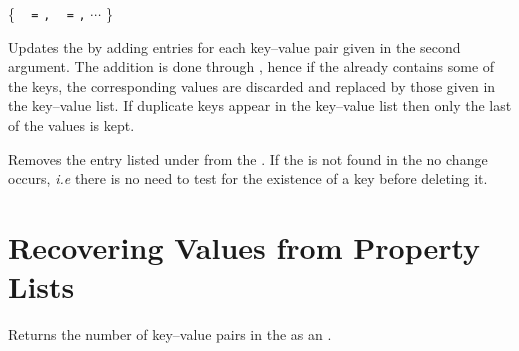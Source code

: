 \documentclass[oneside]{book}
\begin{document}
\begin{function}{\propPutFromKeyval}
\begin{syntax}
 
\{
~  \verb|=|  \verb|,|
~  \verb|=|  \verb|,| $\cdots$
\}
\end{syntax}
Updates the  by adding entries for each key--value
pair given in the second argument.  The addition is done through
, hence if the  already contains
some of the keys, the corresponding values are discarded and
replaced by those given in the key--value list.  If duplicate keys
appear in the key--value list then only the last of the values is kept.
\begin{codehigh}
\propSetFromKeyval {}
\propPutFromKeyval {}
\propVarLog \lTmpaProp
\end{codehigh}
\end{function}

\begin{function}{\propVarRemove}
\begin{syntax}
  
\end{syntax}
Removes the entry listed under  from the
.  If the  is
not found in the  no change occurs,
\emph{i.e} there is no need to test for the existence of a key before
deleting it.
\begin{codehigh}
\propSetFromKeyval {}
\propVarRemove {}
\propVarLog \lTmpaProp
\end{codehigh}
\end{function}

\section{Recovering Values from Property Lists}

\begin{function}{\propVarCount}
\begin{syntax}
 
\end{syntax}
Returns the number of key--value pairs in the 
as an .
\begin{demohigh}
\propSetFromKeyval {}
\propVarCount \lTmpaProp
\end{demohigh}
\end{function}
\end{document}
